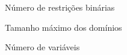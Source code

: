 \begin{simbolos}
	\item[$c$] Número de restrições binárias
	\item[$d$] Tamanho máximo dos domínios
	\item[$n$] Número de variáveis
\end{simbolos}